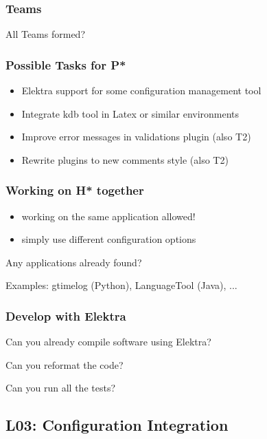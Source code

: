 \begin{frame}
	\frametitle{Teams}

	\begin{task}
	All Teams formed?
	\end{task}
\end{frame}

\begin{frame}
	\frametitle{Possible Tasks for P*}

	\begin{itemize}
	\item Elektra support for some configuration management tool
	\item Integrate kdb tool in Latex or similar environments
	\item Improve error messages in validations plugin (also T2)
	\item Rewrite plugins to new comments style (also T2)
	\end{itemize}
\end{frame}

\begin{frame}
	\frametitle{Working on H* together}

	\begin{itemize}
	\item working on the same application allowed!
	\item simply use different configuration options
	\end{itemize}

	\begin{task}
	Any applications already found?
	\end{task}

	Examples: gtimelog (Python), LanguageTool (Java), ...
\end{frame}

\begin{frame}
	\frametitle{Develop with Elektra}

	\begin{task}
	Can you already compile software using Elektra?
	\end{task}

	\begin{task}
	Can you reformat the code?
	\end{task}

	\begin{task}
	Can you run all the tests?
	\end{task}
\end{frame}

\subsection{L03: Configuration Integration}

